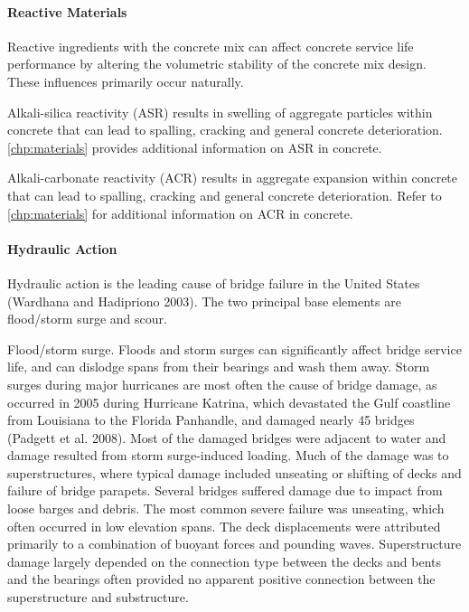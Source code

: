 \paragraph{Reactive Materials}

Reactive ingredients with the concrete mix can affect concrete service life performance by altering the
volumetric stability of the concrete mix design. These influences primarily occur naturally.

Alkali-silica reactivity (ASR) results in swelling of aggregate particles within concrete that can lead to spalling,
cracking and general concrete deterioration. \cref{chp:materials} provides additional information on ASR in concrete.

Alkali-carbonate reactivity (ACR) results in aggregate expansion within concrete that can lead to spalling,
cracking and general concrete deterioration. Refer to \cref{chp:materials} for additional information on ACR in concrete.

\paragraph{Hydraulic Action}

Hydraulic action is the leading cause of bridge failure in the United States (Wardhana and Hadipriono 2003).
The two principal base elements are flood/storm surge and scour.

Flood/storm surge. Floods and storm surges can significantly affect bridge service life, and can dislodge spans
from their bearings and wash them away. Storm surges during major hurricanes are most often the cause of bridge
damage, as occurred in 2005 during Hurricane Katrina, which devastated the Gulf coastline from Louisiana to the
Florida Panhandle, and damaged nearly 45 bridges (Padgett et al. 2008). Most of the damaged bridges were adjacent
to water and damage resulted from storm surge-induced loading. Much of the damage was to superstructures, where
typical damage included unseating or shifting of decks and failure of bridge parapets. Several bridges suffered
damage due to impact from loose barges and debris. The most common severe failure was unseating, which often
occurred in low elevation spans. The deck displacements were attributed primarily to a combination of buoyant
forces and pounding waves. Superstructure damage largely depended on the connection type between the decks and
bents and the bearings often provided no apparent positive connection between the superstructure and substructure.

